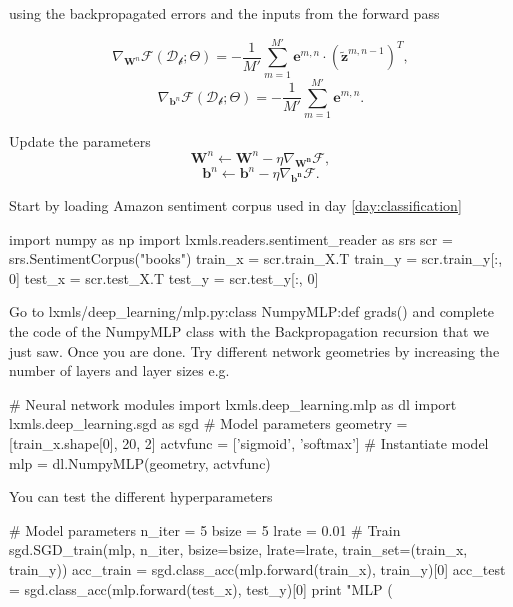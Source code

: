 \begin{algorithm}[th!]
\begin{algorithmic}[1]
		\ENDFOR	
        \ENDIF 

		\vspace{0.3cm}
         using the backpropagated errors and the inputs from the forward pass

        $$\nabla_{\mathbf{W}^n}\mathcal{F}(\mathcal{D_b};\Theta)  = -\frac{1}{M'} \sum_{m=1}^{M'} \mathbf{e}^{m,n} \cdot \left(\tilde{\mathbf{z}}^{m,n-1}\right)^T,$$ 
        $$\nabla_{\mathbf{b}^n}\mathcal{F}(\mathcal{D_b};\Theta)  = - \frac{1}{M'} \sum_{m=1}^{M'} \mathbf{e}^{m,n}.$$  

		\vspace{0.3cm}
        \STATE Update the parameters 
            $$\mathbf{W}^n \leftarrow \mathbf{W}^n - \eta \nabla_\mathbf{W^n}\mathcal{F},$$ 
            $$\mathbf{b}^n \leftarrow \mathbf{b}^n - \eta \nabla_\mathbf{b^n}\mathcal{F}.$$ 

	\ENDFOR

	\ENDFOR
	\ENDFOR
\end{algorithmic}
\end{algorithm}

\clearpage

\begin{exercise}
Start by loading Amazon sentiment corpus used in day \ref{day:classification}

\begin{python}
import numpy as np
import lxmls.readers.sentiment_reader as srs
scr = srs.SentimentCorpus("books")
train_x = scr.train_X.T
train_y = scr.train_y[:, 0]
test_x = scr.test_X.T
test_y = scr.test_y[:, 0]
\end{python}

Go to lxmls/deep\_learning/mlp.py:class NumpyMLP:def grads() and complete the
code of the NumpyMLP class with the Backpropagation recursion that we just saw.
Once you are done. Try different network geometries by increasing the number of
layers and layer sizes e.g.
\begin{python}
# Neural network modules
import lxmls.deep_learning.mlp as dl
import lxmls.deep_learning.sgd as sgd
# Model parameters
geometry = [train_x.shape[0], 20, 2]
actvfunc = ['sigmoid', 'softmax'] 
# Instantiate model
mlp      = dl.NumpyMLP(geometry, actvfunc) 
\end{python}
You can test the different hyperparameters 
\begin{python}
# Model parameters
n_iter = 5
bsize  = 5
lrate  = 0.01
# Train
sgd.SGD_train(mlp, n_iter, bsize=bsize, lrate=lrate, train_set=(train_x, train_y))
acc_train = sgd.class_acc(mlp.forward(train_x), train_y)[0]
acc_test  = sgd.class_acc(mlp.forward(test_x), test_y)[0]
print "MLP (%
\end{python}
\end{exercise}

